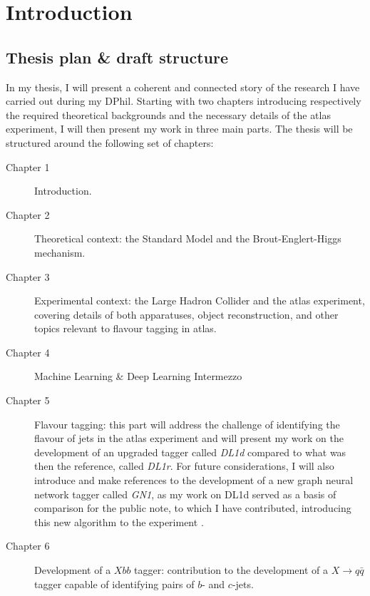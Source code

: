 \chapter{Introduction}
\section*{Thesis plan \& draft structure}
In my thesis, I will present a coherent and connected story of the research I have carried out during my DPhil. Starting with two chapters introducing respectively the required theoretical backgrounds and the necessary details of the \gls{atlas} experiment, I will then present my work in three main parts.  The thesis will be structured around the following set of chapters:
\begin{description}
\item[Chapter 1] Introduction. \\ \vspace{-15pt}
\item[Chapter 2] Theoretical context: the Standard Model and the Brout-Englert-Higgs mechanism. \\  \vspace{-15pt}
\item[Chapter 3] Experimental context: the Large Hadron Collider and the \gls{atlas} experiment, covering details of both apparatuses, object reconstruction, and other topics relevant to flavour tagging in \gls{atlas}. \\  \vspace{-15pt}
\item[Chapter 4] Machine Learning \& Deep Learning Intermezzo
\item[Chapter 5] Flavour tagging: this part will address the challenge of identifying the flavour of jets in the \gls{atlas} experiment and will present my work on the development of an upgraded tagger called \textit{DL1d} compared to what was then the reference, called \textit{DL1r}. For future considerations, I will also introduce and make references to the development of a new graph neural network tagger called \textit{GN1}, as my work on DL1d served as a basis of comparison for the public note, to which I have contributed, introducing this new algorithm to the experiment \cite{ATL-PHYS-PUB-2022-027}. \\  \vspace{-15pt}
\item[Chapter 6] Development of a $Xbb$ tagger: contribution to the development of a $X \rightarrow q\bar{q}$ tagger capable of identifying pairs of $b$- and $c$-jets.

\end{description}
